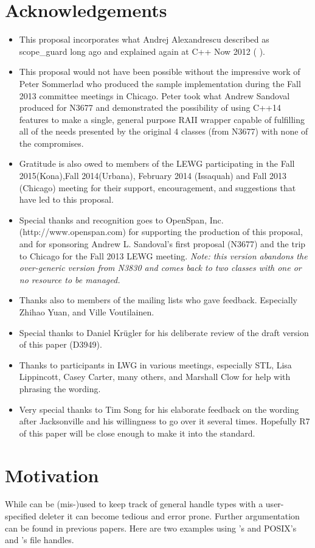 \documentclass[ebook,11pt,article]{memoir}
\begin{document}
\chapter{Acknowledgements}
\begin{itemize}
\item This proposal incorporates what Andrej Alexandrescu described as scope_guard long ago and explained again at C++ Now 2012 (%
).
\item This proposal would not have been possible without the impressive work of Peter Sommerlad who produced the sample implementation during the Fall 2013 committee meetings in Chicago.  Peter took what Andrew Sandoval produced for N3677 and demonstrated the possibility of using C++14 features to make a single, general purpose RAII wrapper capable of fulfilling all of the needs presented by the original 4 classes (from N3677) with none of the compromises.
\item Gratitude is also owed to members of the LEWG participating in the Fall 2015(Kona),Fall 2014(Urbana), February 2014 (Issaquah) and Fall 2013 (Chicago) meeting for their support, encouragement, and suggestions that have led to this proposal.
\item Special thanks and recognition goes to OpenSpan, Inc. (http://www.openspan.com) for supporting the production of this proposal, and for sponsoring Andrew L. Sandoval's first proposal (N3677) and the trip to Chicago for the Fall 2013 LEWG meeting. \emph{Note: this version abandons the over-generic version from N3830 and comes back to two classes with one or no resource to be managed.}
\item Thanks also to members of the mailing lists who gave feedback. Especially Zhihao Yuan, and Ville Voutilainen.
\item Special thanks to Daniel Kr\"ugler for his deliberate review of the draft version of this paper (D3949).
\item Thanks to participants in LWG in various meetings, especially STL, Lisa Lippincott, Casey Carter, many others, and Marshall Clow for help with phrasing the wording.
\item Very special thanks to Tim Song for his elaborate feedback on the wording after Jacksonville and his willingness to go over it several times. Hopefully R7 of this paper will be close enough to make it into the standard.
\end{itemize}
\newpage
\chapter{Motivation}
While  can be (mis-)used to keep track of general handle types with a user-specified deleter it can become tedious and error prone. Further argumentation can be found in previous papers. Here are two examples using  's  and POSIX's and 's  file handles. 
\end{document}
